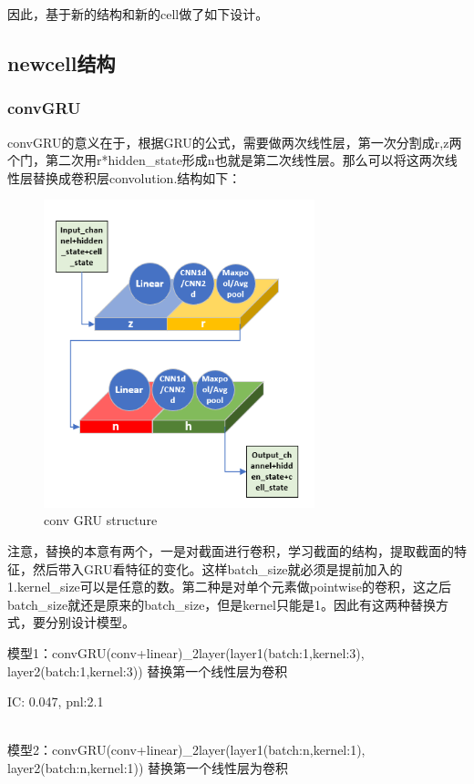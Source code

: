 \documentclass[11pt]{ctexart}
\begin{document}
因此，基于新的结构和新的cell做了如下设计。
\subsection{newcell结构}

\subsubsection{convGRU}
convGRU的意义在于，根据GRU的公式，需要做两次线性层，第一次分割成r,z两个门，第二次用r*hidden\_state形成n也就是第二次线性层。那么可以将这两次线性层替换成卷积层convolution.结构如下：
\begin{figure}[H]
\begin{center}
\includegraphics[width=0.7\textwidth]{str5.PNG}
\end{center}
\caption{conv GRU structure}
\label{FIG.4}
\end{figure}

注意，替换的本意有两个，一是对截面进行卷积，学习截面的结构，提取截面的特征，然后带入GRU看特征的变化。这样batch\_size就必须是提前加入的1.kernel\_size可以是任意的数。第二种是对单个元素做pointwise的卷积，这之后batch\_size就还是原来的batch\_size，但是kernel只能是1。因此有这两种替换方式，要分别设计模型。

模型1：convGRU(conv+linear)\_2layer(layer1(batch:1,kernel:3), layer2(batch:1,kernel:3)) 替换第一个线性层为卷积

{\kaishu \small IC: 0.047, pnl:2.1}

~\\
模型2：convGRU(conv+linear)\_2layer(layer1(batch:n,kernel:1), layer2(batch:n,kernel:1)) 替换第一个线性层为卷积
\end{document}
